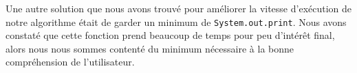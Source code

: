 \vspace{1em}

Une autre solution que nous avons trouvé pour améliorer la vitesse  d'exécution de notre algorithme était de garder un minimum de \verb!System.out.print!. Nous avons constaté que cette fonction prend beaucoup de temps pour peu d'intérêt final, alors nous nous sommes contenté du minimum nécessaire à la bonne compréhension de l'utilisateur.